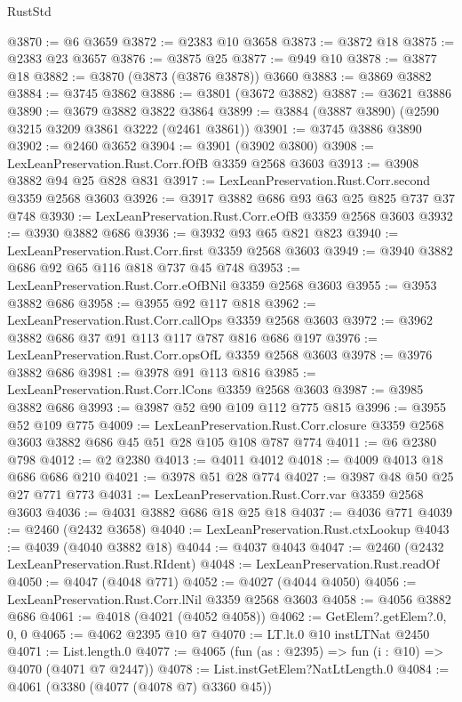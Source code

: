 \begin{lexlean}{RustStd}
\begin{coremodule}
@3870 := @6 @3659
@3872 := @2383 @10 @3658
@3873 := @3872 @18
@3875 := @2383 @23 @3657
@3876 := @3875 @25
@3877 := @949 @10
@3878 := @3877 @18
@3882 := @3870 (@3873 (@3876 @3878)) @3660
@3883 := @3869 @3882
@3884 := @3745 @3862
@3886 := @3801 (@3672 @3882)
@3887 := @3621 @3886
@3890 := @3679 @3882 @3822 @3864
@3899 := @3884 (@3887 @3890) (@2590 @3215 @3209 @3861 @3222 (@2461 @3861))
@3901 := @3745 @3886 @3890
@3902 := @2460 @3652
@3904 := @3901 (@3902 @3800)
@3908 := LexLeanPreservation.Rust.Corr.fOfB @3359 @2568 @3603
@3913 := @3908 @3882 @94 @25 @828 @831
@3917 := LexLeanPreservation.Rust.Corr.second @3359 @2568 @3603
@3926 := @3917 @3882 @686 @93 @63 @25 @825 @737 @37 @748
@3930 := LexLeanPreservation.Rust.Corr.eOfB @3359 @2568 @3603
@3932 := @3930 @3882 @686
@3936 := @3932 @93 @65 @821 @823
@3940 := LexLeanPreservation.Rust.Corr.first @3359 @2568 @3603
@3949 := @3940 @3882 @686 @92 @65 @116 @818 @737 @45 @748
@3953 := LexLeanPreservation.Rust.Corr.eOfBNil @3359 @2568 @3603
@3955 := @3953 @3882 @686
@3958 := @3955 @92 @117 @818
@3962 := LexLeanPreservation.Rust.Corr.callOps @3359 @2568 @3603
@3972 := @3962 @3882 @686 @37 @91 @113 @117 @787 @816 @686 @197
@3976 := LexLeanPreservation.Rust.Corr.opsOfL @3359 @2568 @3603
@3978 := @3976 @3882 @686
@3981 := @3978 @91 @113 @816
@3985 := LexLeanPreservation.Rust.Corr.lCons @3359 @2568 @3603
@3987 := @3985 @3882 @686
@3993 := @3987 @52 @90 @109 @112 @775 @815
@3996 := @3955 @52 @109 @775
@4009 := LexLeanPreservation.Rust.Corr.closure
    @3359
    @2568
    @3603
    @3882
    @686
    @45
    @51
    @28
    @105
    @108
    @787
    @774
@4011 := @6 @2380 @798
@4012 := @2 @2380
@4013 := @4011 @4012
@4018 := @4009 @4013 @18 @686 @686 @210
@4021 := @3978 @51 @28 @774
@4027 := @3987 @48 @50 @25 @27 @771 @773
@4031 := LexLeanPreservation.Rust.Corr.var @3359 @2568 @3603
@4036 := @4031 @3882 @686 @18 @25 @18
@4037 := @4036 @771
@4039 := @2460 (@2432 @3658)
@4040 := LexLeanPreservation.Rust.ctxLookup
@4043 := @4039 (@4040 @3882 @18)
@4044 := @4037 @4043
@4047 := @2460 (@2432 LexLeanPreservation.Rust.RIdent)
@4048 := LexLeanPreservation.Rust.readOf
@4050 := @4047 (@4048 @771)
@4052 := @4027 (@4044 @4050)
@4056 := LexLeanPreservation.Rust.Corr.lNil @3359 @2568 @3603
@4058 := @4056 @3882 @686
@4061 := @4018 (@4021 (@4052 @4058))
@4062 := GetElem?.getElem?.{0, 0, 0}
@4065 := @4062 @2395 @10 @7
@4070 := LT.lt.{0} @10 instLTNat @2450
@4071 := List.length.{0}
@4077 := @4065 (fun (as : @2395) => fun (i : @10) => @4070 (@4071 @7 @2447))
@4078 := List.instGetElem?NatLtLength.{0}
@4084 := @4061 (@3380 (@4077 (@4078 @7) @3360 @45))

\end{coremodule}
\end{lexlean}
